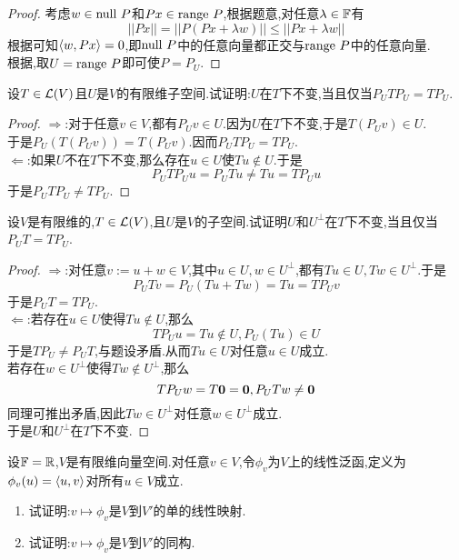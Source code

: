 \documentclass{ctexart}
\begin{document}
\begin{proof}
    考虑$w\in\text{null } P$和$Px\in\text{range } P$,根据题意,对任意$\lambda\in\mathbb{F}$有
    \[||Px||=||P(Px+\lambda w)||\leqslant||Px+\lambda w||\]
    根据可知$\left\langle{w},{Px}\right\rangle=0$,即$\text{null } P$中的任意向量都正交与$\text{range } P$中的任意向量.\\
    根据,取$U=\text{range } P$即可使$P=P_U$.
\end{proof}
\begin{problem}[11.]
    设$T\in\mathcal{L}(V)$且$U$是$V$的有限维子空间.试证明:$U$在$T$下不变,当且仅当$P_UTP_U=TP_U$.
\end{problem}
\begin{proof}
    $\Rightarrow$:对于任意$v\in V$,都有$P_Uv\in U$.因为$U$在$T$下不变,于是$T\left(P_Uv\right)\in U$.\\
    于是$P_U\left(T\left(P_Uv\right)\right)=T\left(P_Uv\right)$.因而$P_UTP_U=TP_U$.\\
    $\Leftarrow$:如果$U$不在$T$下不变,那么存在$u\in U$使$Tu\notin U$.于是
    \[P_UTP_Uu=P_UTu\neq Tu=TP_Uu\]
    于是$P_UTP_U\neq TP_U$.
\end{proof}
\begin{problem}[12.]
    设$V$是有限维的,$T\in\mathcal{L}(V)$,且$U$是$V$的子空间.试证明$U$和$U^\bot$在$T$下不变,当且仅当$P_UT=TP_U$.
\end{problem}
\begin{proof}
    $\Rightarrow$:对任意$v:=u+w\in V$,其中$u\in U,w\in U^\bot$,都有$Tu\in U,Tw\in U^\bot$.于是
    \[P_UTv=P_U\left(Tu+Tw\right)=Tu=TP_Uv\]
    于是$P_UT=TP_U$.\\
    $\Leftarrow$:若存在$u\in U$使得$Tu\notin U$,那么
    \[TP_Uu=Tu\notin U,P_U(Tu)\in U\]
    于是$TP_U\neq P_UT$,与题设矛盾.从而$Tu\in U$对任意$u\in U$成立.\\
    若存在$w\in U^\bot$使得$Tw\notin U^\bot$,那么
    \[TP_Uw=T\mathbf0=\mathbf0,P_UTw\neq\mathbf0\]
    同理可推出矛盾,因此$Tw\in U^\bot$对任意$w\in U^\bot$成立.\\
    于是$U$和$U^\bot$在$T$下不变.
\end{proof}
\begin{problem}[13.]
    设$\mathbb{F}=\mathbb{R}$,$V$是有限维向量空间.对任意$v\in V$,令$\phi_v$为$V$上的线性泛函,定义为$\phi_v(u)=\left\langle{u},{v}\right\rangle$对所有$u\in V$成立.
    \begin{enumerate}[label=\tbf{(\arabic*)}]
        \item 试证明:$v\mapsto\phi_v$是$V$到$V'$的单的线性映射.
        \item 试证明:$v\mapsto\phi_v$是$V$到$V'$的同构.
    \end{enumerate}
\end{problem}
\end{document}

